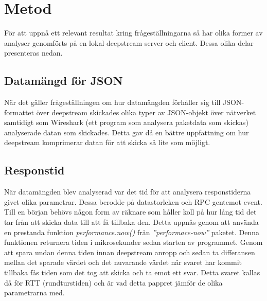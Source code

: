 \section{Metod}
\label{sec:tim-method}
För att uppnå ett relevant resultat kring frågeställningarna så har olika former av analyser genomförts på en lokal deepstream server och client. Dessa olika delar presenteras nedan.

\subsection{Datamängd för JSON}
När det gäller frågeställningen om hur datamängden förhåller sig till JSON-formattet över deepstream skickades olika typer av JSON-objekt över nätverket samtidigt som Wireshark (ett program som analysera paketdata som skickas) analyserade datan som skickades. Detta gav då en bättre uppfattning om hur deepstream komprimerar datan för att skicka så lite som möjligt.

\subsection{Responstid}
När datamängden blev analyserad var det tid för att analysera responstiderna givet olika parametrar. Dessa berodde på datastorleken och RPC gentemot event. Till en början behövs någon form av räknare som håller koll på hur lång tid det tar från att skicka data till att få tillbaka den. Detta uppnås genom att använda en prestanda funktion \textit{performance.now()} från \textit{''performace-now''} paketet. Denna funktionen returnera tiden i mikrosekunder sedan starten av programmet\cite{performance-now}. Genom att spara undan denna tiden innan deepstream anropp och sedan ta differansen mellan det sparade värdet och det nuvarande värdet när svaret har kommit tillbaka fås tiden som det tog att skicka och ta emot ett svar. Detta svaret kallas då för RTT (rundturstiden) och är vad detta pappret jämför de olika parametrarna med. 

